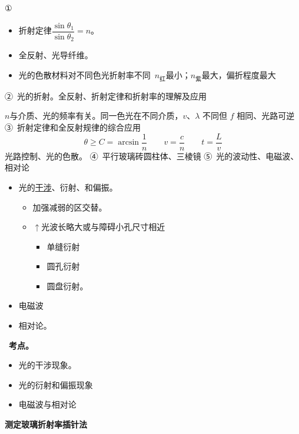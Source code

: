 ①
\begin{itemize}
\item 折射定律\quad $\dfrac{\sin\theta_1}{\sin\theta_2}=n$。
\item 全反射、光导纤维。
\item 光的色散\quad 材料对不同色光折射率不同\ $n_{\text{红}}$最小；$n_{\text{紫}}$最大，偏折程度最大
\end{itemize}
②\ 光的折射。全反射、折射定律和折射率的理解及应用

$n$与介质、光的频率有关。同一色光在不同介质，$v$、$\lambda$ 不同但 $f$ 相同、光路可逆
③\ 折射定律和全反射规律的综合应用
\[ \theta\ge C=\arcsin\frac{1}{n}\qquad v=\frac{c}{n}\qquad t=\frac{L}{v} \]
光路控制、光的色散。
④\ 平行玻璃砖\quad 圆柱体、三棱镜
⑤\ 光的波动性、电磁波、相对论
\begin{itemize}
\item 光的\uline{干涉}、衍射、和偏振。
  \begin{itemize}
  \item 加强减弱的区交替。
  \item $\uparrow$光波长略大或与障碍小孔尺寸相近
    \begin{itemize}
    \item 单缝衍射
    \item 圆孔衍射
    \item 圆盘衍射。
    \end{itemize}
  \end{itemize}
\item 电磁波
\item 相对论。
\end{itemize}
\ \textbf{考点。}
\begin{itemize}
\item 光的干涉现象。
\item 光的衍射和偏振现象
\item 电磁波与相对论
\end{itemize}
\textbf{测定玻璃折射率\quad 插针法}

